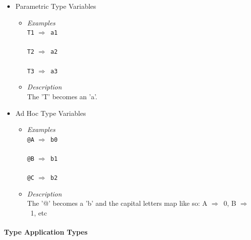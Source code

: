 \documentclass{article}
\def\lra{$\Longrightarrow$\ }
\begin{document}
\begin{itemize}

\item
Parametric Type Variables

\begin{itemize}

\item
\textit{Examples}\\

\verb|T1| \lra \verb|a1|\\\\
\verb|T2| \lra \verb|a2|\\\\
\verb|T3| \lra \verb|a3|\\

\item
\textit{Description}\\

The 'T' becomes an 'a'.
\end{itemize}

\item
Ad Hoc Type Variables

\begin{itemize}
\item
\textit{Examples}\\

\verb|@A| \lra \verb|b0|\\\\
\verb|@B| \lra \verb|b1|\\\\
\verb|@C| \lra \verb|b2|\\
\item
\textit{Description}\\

The '@' becomes a 'b' and the capital letters map like so:
A \lra 0, B \lra 1, etc
\end{itemize}

\end{itemize}

\newpage
\paragraph{Type Application Types}
\end{document}
